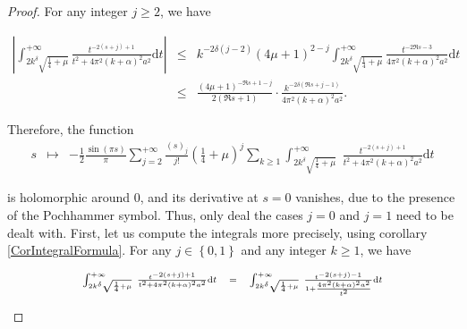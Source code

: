 \documentclass{jams-l}
\theoremstyle{definition}
\theoremstyle{remark}
\numberwithin{equation}{section}
\begin{document}
\begin{proof}
                    \noindent For any integer $j \geqslant 2$, we have
                    
                    \[ \begin{array}{lll}
                            \scriptstyle \left \vert \int_{2 k^{\delta} \sqrt{\frac{1}{4} + \mu}}^{+ \infty} \frac{t^{-2 \left( s+j \right) + 1}}{t^2 + 4 \pi^2 \left( k + \alpha \right)^2 a^2} \mathrm{d}t \right \vert & \scriptstyle \leqslant & \scriptstyle k^{-2 \delta \left( j-2 \right)} \left( 4 \mu + 1 \right)^{2-j} \int_{2 k^{\delta} \sqrt{\frac{1}{4} + \mu}}^{+ \infty} \frac{t^{- 2 \Re s - 3}}{4 \pi^2 \left( k + \alpha \right)^2 a^2} \mathrm{d}t \\[1em]
                            
                            & \scriptstyle \leqslant & \scriptstyle \frac{\left( 4 \mu + 1 \right)^{- \Re s + 1 - j}}{2 \left( \Re s + 1 \right)} \cdot \frac{k^{-2 \delta \left( \Re s + j - 1 \right)}}{4 \pi^2 \left( k + \alpha \right)^2 a^2}.
                        \end{array} \]
                    
                    \noindent Therefore, the function
                    \[ \begin{array}{lll}
                            s & \longmapsto & - \frac{1}{2} \frac{\sin \left( \pi s \right)}{\pi} \sum\limits_{j = 2}^{+ \infty} \frac{\left( s \right)_j}{j!} \left( \frac{1}{4} + \mu \right)^j \sum\limits_{k \geqslant 1} \int_{2 k^{\delta} \sqrt{\frac{1}{4} + \mu}}^{+ \infty} \; \frac{t^{-2 \left( s+j \right) + 1}}{t^2 + 4 \pi^2 \left( k + \alpha \right)^2 a^2} \mathrm{d}t
                        \end{array} \]
                    
                    \noindent is holomorphic around $0$, and its derivative at $s=0$ vanishes, due to the presence of the Pochhammer symbol. Thus, only deal the cases $j = 0$ and $j = 1$ need to be dealt with. First, let us compute the integrals more precisely, using corollary \ref{CorIntegralFormula}. For any $j \in \left \{ 0, 1 \right \}$ and any integer $k \geqslant 1$, we have
                    
                    \[ \begin{array}{lllll}
                            \multicolumn{3}{l}{\scriptstyle \int_{2 k^{\delta} \sqrt{\frac{1}{4} + \mu}}^{+ \infty} \; \frac{t^{-2 \left( s+j \right) + 1}}{t^2 + 4 \pi^2 \left( k + \alpha \right)^2 a^2} \mathrm{d}t} & \scriptstyle = & \scriptstyle \scriptstyle \int_{2 k^{\delta} \sqrt{\frac{1}{4} + \mu}}^{+ \infty} \; \frac{t^{-2 \left( s+j \right) - 1}}{1 + \frac{4 \pi^2 \left( k + \alpha \right)^2 a^2}{t^2}} \mathrm{d}t \\[1em]
                            

\end{array}\]
\end{proof}
\end{document}
